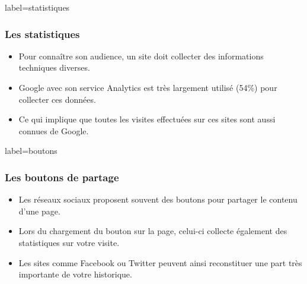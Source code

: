 \documentclass{beamer}
\begin{document}
        \begin{frame}{label=statistiques}
            \frametitle{Les statistiques}
            \begin{center}
                \begin{itemize}
                    \item Pour connaître son audience, un site doit collecter des informations techniques diverses.
                    \item Google avec son service Analytics est très largement utilisé (54\%) pour collecter ces données.
                    \item Ce qui implique que toutes les visites effectuées sur ces sites sont aussi connues de Google.
                \end{itemize}
            \end{center}
        \end{frame}
        \begin{frame}{label=boutons}
            \frametitle{Les boutons de partage}
            \begin{center}
                \begin{itemize}
                    \item Les réseaux sociaux proposent souvent des boutons pour partager le contenu d'une page.
                    \item Lors du chargement du bouton sur la page, celui-ci collecte également des statistiques sur votre visite.
                    \item Les sites comme Facebook ou Twitter peuvent ainsi reconstituer une part très importante de votre historique.
                \end{itemize}
            \end{center}
        \end{frame}
\end{document}
